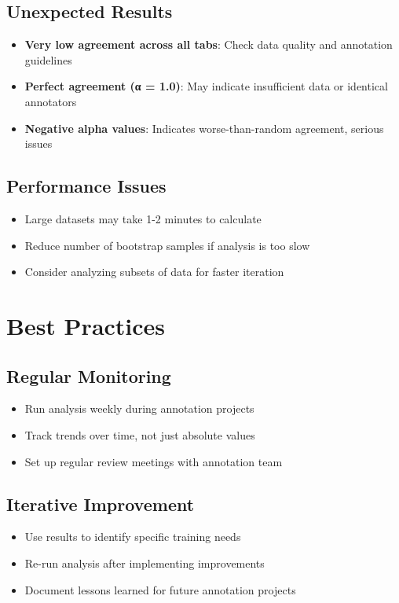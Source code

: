 \documentclass[11pt]{article}
\begin{document}
\subsection{Unexpected Results}
\begin{itemize}
\item \textbf{Very low agreement across all tabs}: Check data quality and annotation guidelines
\item \textbf{Perfect agreement (α = 1.0)}: May indicate insufficient data or identical annotators
\item \textbf{Negative alpha values}: Indicates worse-than-random agreement, serious issues
\end{itemize}

\subsection{Performance Issues}
\begin{itemize}
\item Large datasets may take 1-2 minutes to calculate
\item Reduce number of bootstrap samples if analysis is too slow
\item Consider analyzing subsets of data for faster iteration
\end{itemize}

\section{Best Practices}

\subsection{Regular Monitoring}
\begin{itemize}
\item Run analysis weekly during annotation projects
\item Track trends over time, not just absolute values
\item Set up regular review meetings with annotation team
\end{itemize}

\subsection{Iterative Improvement}
\begin{itemize}
\item Use results to identify specific training needs
\item Re-run analysis after implementing improvements
\item Document lessons learned for future annotation projects
\end{itemize}
\end{document}
